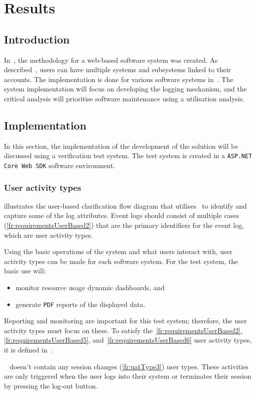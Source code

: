 \chapter{Results}
\label{chap:3}

\section{Introduction}
In~, the methodology for a web-based software system was created. As described~, users can have multiple systems and subsystems linked to their accounts. The implementation is done for various software systems in~. The system implementation will focus on developing the logging mechanism, and the critical analysis will prioritise software maintenance using a utilisation analysis.

\section{Implementation}\label{sec:ch3_implementation}
In this section, the implementation of the development of the solution will be discussed using a verification test system. The test system is created in a \texttt{ASP.NET Core Web SDK} software environment.

\subsection{User activity types}
 illustrates the user-based clarification flow diagram that utilises~ to identify and capture some of the log attributes. Event logs should consist of multiple cases (\ref{fr:requirementsUserBased2}) that are the primary identifiers for the event log, which are user activity types.\par Using the basic operations of the system and what users interact with, user activity types can be made for each software system. For the test system, the basic use will:

\begin{itemize}
	\item monitor resource usage dynamic dashboards, and
	\item generate \texttt{PDF} reports of the displayed data.
\end{itemize}

Reporting and monitoring are important for this test system; therefore, the user activity types must focus on these. To satisfy the~\ref{fr:requirementsUserBased2}, \ref{fr:requirementsUserBased5}, and~\ref{fr:requirementsUserBased6} user activity types, it is defined in~. \par~ doesn't contain any session changes (\ref{fr:uatType3}) user types. These activities are only triggered when the user logs into their system or terminates their session by pressing the log-out button.

